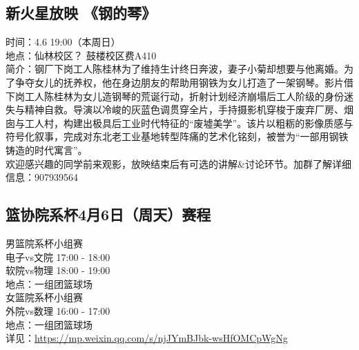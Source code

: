 \documentclass[letterpaper, 12pt]{article}
\begin{document}
\begin{multicols}{2}
\subsection{新火星放映 《钢的琴》}
时间：4.6 19:00（本周日）
\\地点：仙林校区？ 鼓楼校区费A410
\\简介：钢厂下岗工人陈桂林为了维持生计终日奔波，妻子小菊却想要与他离婚。为了争夺女儿的抚养权，他在身边朋友的帮助用钢铁为女儿打造了一架钢琴。影片借下岗工人陈桂林为女儿造钢琴的荒诞行动，折射计划经济崩塌后工人阶级的身份迷失与精神自救。导演以冷峻的灰蓝色调贯穿全片，手持摄影机穿梭于废弃厂房、烟囱与工人村，构建出极具后工业时代特征的“废墟美学”。该片以粗粝的影像质感与符号化叙事，完成对东北老工业基地转型阵痛的艺术化铭刻，被誉为“一部用钢铁铸造的时代寓言”。
\\欢迎感兴趣的同学前来观影，放映结束后有可选的讲解\&讨论环节。加群了解详细信息：907939564


\subsection{篮协院系杯4月6日（周天）赛程}
男篮院系杯小组赛
\\电子vs文院 17:00 - 18:00
\\软院vs物理 18:00 - 19:00
\\地点：一组团篮球场
\\女篮院系杯小组赛
\\外院vs数理 16:00 - 17:00
\\地点：一组团篮球场
\\详见：\url{https://mp.weixin.qq.com/s/njJYmBJbk-wsHfOMCpWgNg}


\end{multicols}
\end{document}
